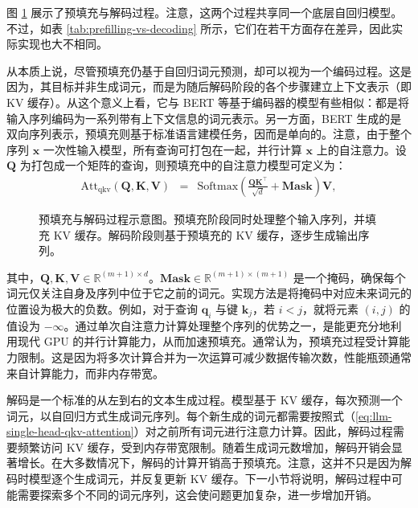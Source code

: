 图 \ref{fig:prefilling-and-decoding} 展示了预填充与解码过程。注意，这两个过程共享同一个底层自回归模型。不过，如表 \ref{tab:prefilling-vs-decoding} 所示，它们在若干方面存在差异，因此实际实现也大不相同。

从本质上说，尽管预填充仍基于自回归词元预测，却可以视为一个编码过程。这是因为，其目标并非生成词元，而是为随后解码阶段的各个步骤建立上下文表示（即 KV 缓存）。从这个意义上看，它与 BERT 等基于编码器的模型有些相似：都是将输入序列编码为一系列带有上下文信息的词元表示。另一方面，BERT 生成的是双向序列表示，预填充则基于标准语言建模任务，因而是单向的。注意，由于整个序列 $\mathbf{x}$ 一次性输入模型，所有查询可打包在一起，并行计算 $\mathbf{x}$ 上的自注意力。设 $\mathbf{Q}$ 为打包成一个矩阵的查询，则预填充中的自注意力模型可定义为：
\begin{eqnarray}
\mathrm{Att}_{\mathrm{qkv}}(\mathbf{Q},\mathbf{K},\mathbf{V}) & = & \mathrm{Softmax}(\frac{\mathbf{Q} \mathbf{K}^{\top}}{\sqrt{d}} + \mathbf{Mask}) \mathbf{V}, \label{eq:llm-prefilling-qkv-attention}
\end{eqnarray}

\begin{figure}[!t]
\centering

\vspace{-0.5cm} \caption{预填充与解码过程示意图。预填充阶段同时处理整个输入序列，并填充 KV 缓存。解码阶段则基于预填充的 KV 缓存，逐步生成输出序列。}
\label{fig:prefilling-and-decoding}
\end{figure}

\noindent 其中，$\mathbf{Q}, \mathbf{K}, \mathbf{V} \in \mathbb{R}^{(m+1) \times d}$。$\mathbf{Mask} \in \mathbb{R}^{(m+1) \times (m+1)}$ 是一个掩码，确保每个词元仅关注自身及序列中位于它之前的词元。实现方法是将掩码中对应未来词元的位置设为极大的负数。例如，对于查询 $\mathbf{q}_{i}$ 与键 $\mathbf{k}_{j}$，若 $i < j$，就将元素 $(i,j)$ 的值设为 $-\infty$。通过单次自注意力计算处理整个序列的优势之一，是能更充分地利用现代 GPU 的并行计算能力，从而加速预填充。通常认为，预填充过程受计算能力限制。这是因为将多次计算合并为一次运算可减少数据传输次数，性能瓶颈通常来自计算能力，而非内存带宽。

解码是一个标准的从左到右的文本生成过程。模型基于 KV 缓存，每次预测一个词元，以自回归方式生成词元序列。每个新生成的词元都需要按照式（\ref{eq:llm-single-head-qkv-attention}）对之前所有词元进行注意力计算。因此，解码过程需要频繁访问 KV 缓存，受到内存带宽限制。随着生成词元数增加，解码开销会显著增长。在大多数情况下，解码的计算开销高于预填充。注意，这并不只是因为解码时模型逐个生成词元，并反复更新 KV 缓存。下一小节将说明，解码过程中可能需要探索多个不同的词元序列，这会使问题更加复杂，进一步增加开销。

